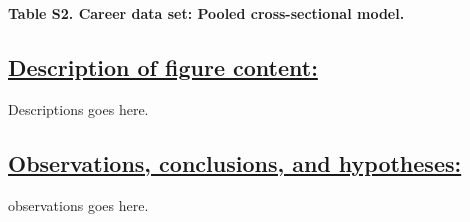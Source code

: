 \documentclass{article}\usepackage[]{graphicx}\usepackage[]{color}
\begin{document}
\begin{center}
\par{\textbf{Table S2. Career data set: Pooled cross-sectional model.}}
\end{center}
\subsection*{\underline{Description of figure content:}}
\par{
Descriptions goes here.
}
\subsection*{\underline{Observations, conclusions, and hypotheses:}}
\par{
observations goes here.
}

\newpage
\end{document}
